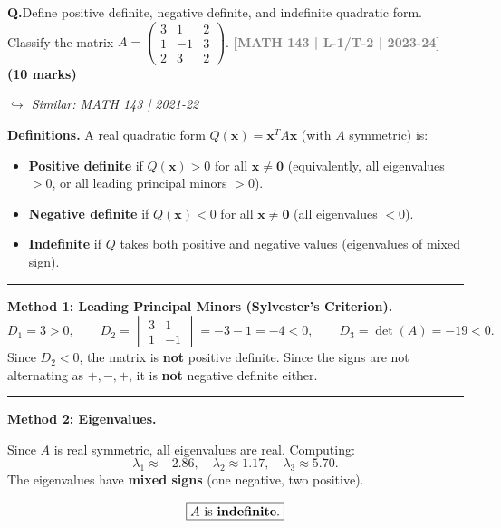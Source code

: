 \documentclass[12pt,a3paper]{article}
\newcommand{\yr}[1]{\hfill\textcolor{gray}{\small\textbf{[#1]}}}
\newcommand{\mk}[1]{\textcolor{orange!70!black}{\small\textbf{(#1 marks)}}}
\newcommand{\variant}[1]{\par\vspace{1pt}\textcolor{blue!50!black}%
  {\footnotesize\textit{$\hookrightarrow$ Similar: #1}}}
\newcounter{qnum}
\newcommand{\Q}[1]{%
  \needspace{4\baselineskip}
  \refstepcounter{qnum}
  \vspace{6pt}
  \noindent\textbf{Q\theqnum.}\enspace #1\par
}
\begin{document}
\Q{Define positive definite, negative definite, and indefinite quadratic form. Classify the matrix $A = \begin{pmatrix} 3 & 1 & 2 \\ 1 & -1 & 3 \\ 2 & 3 & 2 \end{pmatrix}$.
\yr{MATH 143 | L-1/T-2 | 2023-24} \mk{10}
\variant{MATH 143 | 2021-22}}

\begin{tcolorbox}[enhanced,breakable,
  colback=cE!4,colframe=cE,boxrule=0.8pt,arc=5pt,
  title={\textbf{Answer --- Classification of Quadratic Form for $A=\begin{pmatrix}3&1&2\\1&-1&3\\2&3&2\end{pmatrix}$}},
  fonttitle=\bfseries\color{white},colbacktitle=cE]
 
\textbf{Definitions.}
A real quadratic form $Q(\mathbf{x}) = \mathbf{x}^T A\mathbf{x}$ (with $A$ symmetric) is:
\begin{itemize}[itemsep=2pt]
  \item \textbf{Positive definite} if $Q(\mathbf{x}) > 0$ for all $\mathbf{x} \neq \mathbf{0}$
        (equivalently, all eigenvalues $> 0$, or all leading principal minors $> 0$).
  \item \textbf{Negative definite} if $Q(\mathbf{x}) < 0$ for all $\mathbf{x} \neq \mathbf{0}$
        (all eigenvalues $< 0$).
  \item \textbf{Indefinite} if $Q$ takes both positive and negative values
        (eigenvalues of mixed sign).
\end{itemize}
 
\medskip\textcolor{cE}{\rule{\textwidth}{0.4pt}}
 
\textbf{Method 1: Leading Principal Minors (Sylvester's Criterion).}
\[
  D_1 = 3 > 0, \qquad
  D_2 = \begin{vmatrix}3&1\\1&-1\end{vmatrix} = -3-1 = -4 < 0, \qquad
  D_3 = \det(A) = -19 < 0.
\]
Since $D_2 < 0$, the matrix is \textbf{not} positive definite.
Since the signs are not alternating as $+,-,+$, it is \textbf{not} negative definite either.
 
\medskip\textcolor{cE}{\rule{\textwidth}{0.4pt}}
 
\textbf{Method 2: Eigenvalues.}
 
Since $A$ is real symmetric, all eigenvalues are real. Computing:
\[
  \lambda_1 \approx -2.86, \quad \lambda_2 \approx 1.17, \quad \lambda_3 \approx 5.70.
\]
The eigenvalues have \textbf{mixed signs} (one negative, two positive).
 
\medskip
\[
  \boxed{A \text{ is \textbf{indefinite}}.}
\]
 
\end{tcolorbox}
 
\end{document}

